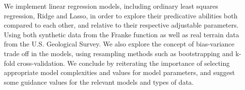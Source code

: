 We implement linear regression models, including ordinary least squares regression, Ridge and Lasso, in order to explore their predicative abilities both compared to each other, and relative to their respective adjustable parameters. 
Using both synthetic data from the Franke function \citep[p. 13]{frank} as well as real terrain data from the U.S. Geological Survey. 
We also explore the concept of bias-variance trade off in the models, using resampling methods such as bootstrapping and k-fold cross-validation. 
We conclude by reiterating the importance of selecting appropriate model complexities and values for model parameters, and suggest some guidance values for the relevant models and types of data. 